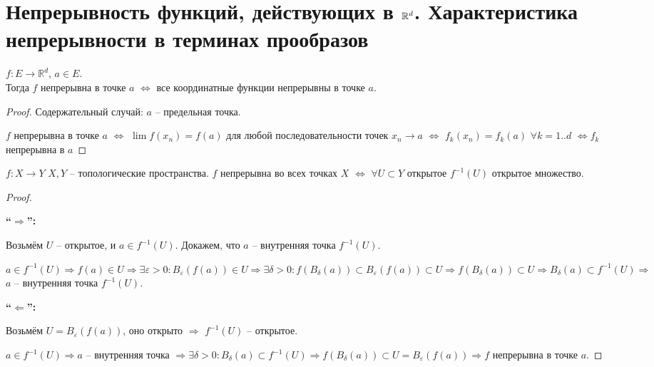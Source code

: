 
\section{Непрерывность функций, действующих в $\mathbb{R}^d$. Характеристика непрерывности в терминах прообразов \href{https://youtu.be/E7inz4tp-6k?t=1769}{\Walley}}


\begin{theorem-non}
\end{theorem-non}
$f : E \rightarrow \mathbb{R}^d$, $a \in E$. \\
Тогда $f$ непрерывна в точке $a$ $\Longleftrightarrow$ все координатные
функции непрерывны в точке $a$.

\begin{proof} Содержательный случай: $a$ -- предельная точка.

    $f$ непрерывна в точке $a$ $\Longleftrightarrow$ $\lim f(x_n) = f(a)$
    для любой последовательности точек $x_n \rightarrow a$
    $\Longleftrightarrow$ $f_k(x_n) = f_k(a) \,\, \forall k = 1..d$
    $\Longleftrightarrow f_k$ непрерывна в $a$

\end{proof}

\begin{theorem-non}
\end{theorem-non}

$f : X \rightarrow Y$ $X, Y$ -- топологические пространства.
$f$ непрерывна во всех точках $X$ $\Longleftrightarrow$
$\forall U \subset Y$ открытое $f^{-1}(U)$ открытое множество.

\begin{proof} $ $

    \textbf{``$\Longrightarrow$'':}

    Возьмём $U$ -- открытое, и $a \in f^{-1}(U)$.
    Докажем, что $a$ -- внутренняя точка $f^{-1}(U)$.
    
    $a \in f^{-1}(U) \Rightarrow f(a) \in U \Rightarrow \exists
    \varepsilon > 0 : B_{\varepsilon}(f(a)) \in U \Rightarrow
    \exists \delta > 0 : f(B_{\delta}(a)) \subset B_{\varepsilon}(f(a))
    \subset U \Rightarrow f(B_{\delta}(a)) \subset U \Rightarrow
    B_{\delta}(a) \subset f^{-1}(U) \Rightarrow$ $a$ -- внутренняя точка
    $f^{-1}(U)$.

    \textbf{``$\Longleftarrow$'':}

    Возьмём $U = B_\varepsilon (f(a))$, оно открыто $\Rightarrow$
    $f^{-1}(U)$ -- открытое.

    $a \in f^{-1}(U) \Rightarrow a$ -- внутренняя точка $\Rightarrow
    \exists \delta > 0 : B_{\delta}(a) \subset f^{-1}(U) \Rightarrow
    f(B_{\delta}(a)) \subset U = B_\varepsilon(f(a)) \Rightarrow f$
    непрерывна в точке $a$.
\end{proof}